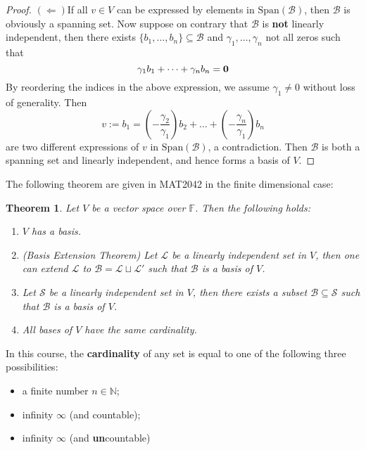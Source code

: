 \documentclass[12pt]{amsbook}
\newtheorem{theorem}{Theorem}[section]
\begin{document}
\begin{proof}
    \noindent $(\Leftarrow) $If all $v \in V$ can be expressed by elements in $\mathrm{Span}(\mathcal{B})$, then $\mathcal{B}$ is obviously a spanning set. Now suppose on contrary that $\mathcal{B}$ is {\bf not} linearly independent, then there exists $\{b_1,\dots, b_n\} \subseteq \mathcal{B}$ and $\gamma_1, \dots, \gamma_n$ not all zeros such that
    $$\gamma_1b_1 + \dots + \gamma_nb_n = {\bf 0}$$
    By reordering the indices in the above expression, we assume $\gamma_1 \neq 0$ without loss of generality. Then
    $$v := b_1 = (-\frac{\gamma_2}{\gamma_1}) b_2 + \dots + (-\frac{\gamma_n}{\gamma_1})b_n$$
    are two different expressions of $v$ in $\mathrm{Span}(\mathcal{B})$, a contradiction. Then $\mathcal{B}$ is both a spanning set and linearly independent, and hence forms a basis of $V$.
\end{proof}

The following theorem are given in MAT2042 in the finite dimensional case:
\begin{theorem} \label{thm-basisextension}
    Let $V$ be a vector space over $\mathbb{F}$. Then the following holds:
    \begin{enumerate}
        \item $V$ has a basis.
        \item (Basis Extension Theorem) Let $\mathcal{L}$ be a linearly independent set in $V$, then one can extend $\mathcal{L}$ to $\mathcal{B} = \mathcal{L} \sqcup \mathcal{L}'$ such that $\mathcal{B}$ is a basis of $V$.
        \item Let $\mathcal{S}$ be a linearly independent set in $V$, then there exists a subset $\mathcal{B} \subseteq \mathcal{S}$ such that $\mathcal{B}$ is a basis of $V$.
        \item All bases of $V$ have the same cardinality.
    \end{enumerate}
\end{theorem}
In this course, the {\bf cardinality} of any set is equal to one of the following three possibilities:
\begin{itemize}
    \item a finite number $n \in \mathbb{N}$;
    \item infinity $\infty$ (and countable);
    \item infinity $\infty$ (and {\bf un}countable)
\end{itemize}
\end{document}
